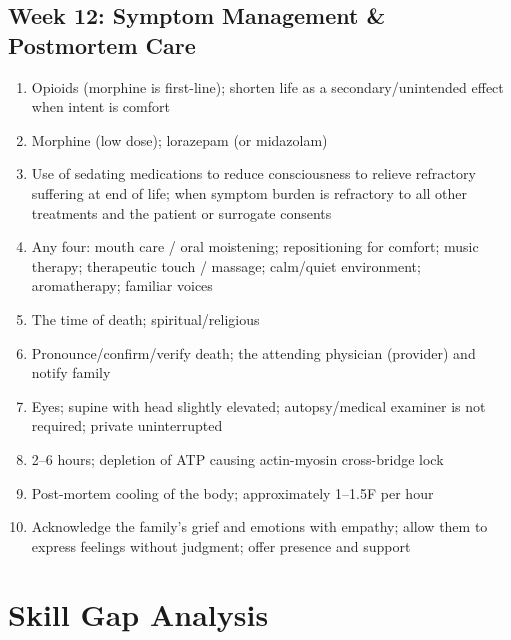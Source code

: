 \documentclass[11pt,letterpaper]{article}
\begin{document}
\begin{keybox}
\subsection*{Week 12: Symptom Management \& Postmortem Care}
\begin{enumerate}[leftmargin=1.5em,label=\textbf{\arabic*.},start=161]
  \item Opioids (morphine is first-line); shorten life as a secondary/unintended effect when
        intent is comfort
  \item Morphine (low dose); lorazepam (or midazolam)
  \item Use of sedating medications to reduce consciousness to relieve refractory suffering at
        end of life; when symptom burden is refractory to all other treatments and the patient
        or surrogate consents
  \item Any four: mouth care / oral moistening; repositioning for comfort; music therapy;
        therapeutic touch / massage; calm/quiet environment; aromatherapy; familiar voices
  \item The time of death; spiritual/religious
  \item Pronounce/confirm/verify death; the attending physician (provider) and notify family
  \item Eyes; supine with head slightly elevated; autopsy/medical examiner is not required;
        private uninterrupted
  \item 2--6 hours; depletion of ATP causing actin-myosin cross-bridge lock
  \item Post-mortem cooling of the body; approximately 1--1.5\textdegree F per hour
  \item Acknowledge the family's grief and emotions with empathy; allow them to express
        feelings without judgment; offer presence and support
\end{enumerate}

\end{keybox}

\newpage

\section{Skill Gap Analysis}
\end{document}

